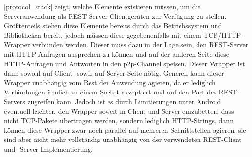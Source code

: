     \figurename \ref{protocol_stack} zeigt, welche Elemente existieren müssen, um die Serveranwendung als REST-Server Clientgeräten zur Verfügung zu stellen. Größtenteils stehen diese Elemente bereits durch das Betriebssystem und Bibliotheken bereit, jedoch müssen diese gegebenenfalls mit einem TCP/HTTP-Wrapper verbunden werden. Dieser muss dazu in der Lage sein, den REST-Server mit HTTP-Anfragen ansprechen zu können und auf der anderen Seite diese HTTP-Anfragen und Antworten in den p2p-Channel speisen. Dieser Wrapper ist dann sowohl auf Client- sowie auf Server-Seite nötig. Generell kann dieser Wrapper unabhängig vom Rest der Anwendung agieren, da er lediglich Verbindungen ähnlich zu einem Socket akzeptiert und auf den Port des REST-Servers zugreifen kann. Jedoch ist es durch Limitierungen unter Android eventuell leichter, den Wrapper soweit in Client und Server einzubetten, dass nicht TCP-Pakete übertragen werden, sondern lediglich HTTP-Strings, dann können diese Wrapper zwar noch parallel auf mehreren Schnittstellen agieren, sie sind aber nicht mehr vollständig unabhängig von der verwendeten REST-Client und -Server Implementierung.